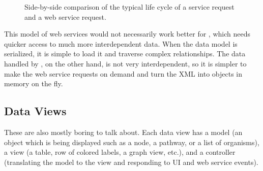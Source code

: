 \begin{figure}[hbt]
    \caption{\label{fig:kegg_impl_web_service_differences} Side-by-side
    comparison of the typical life cycle of a \keggapp service request and a
    \mawapp web service request.}
\end{figure}

This model of web services would not necessarily work better for \mawapp,
which needs quicker access to much more interdependent data. When the data model
is serialized, it is simple to load it and traverse complex relationships. The
data handled by \keggapp, on the other hand, is not very interdependent, so
it is simpler to make the web service requests on demand and turn the XML into
objects in memory on the fly.

\subsection{Data Views}
\label{sect:kegg_impl_data_views}

These are also mostly boring to talk about. Each data view has a model (an
object which is being displayed such as a node, a pathway, or a list of
organisms), a view (a table, row of colored labels, a graph view, etc.), and a
controller (translating the model to the view and responding to UI and web
service events).

